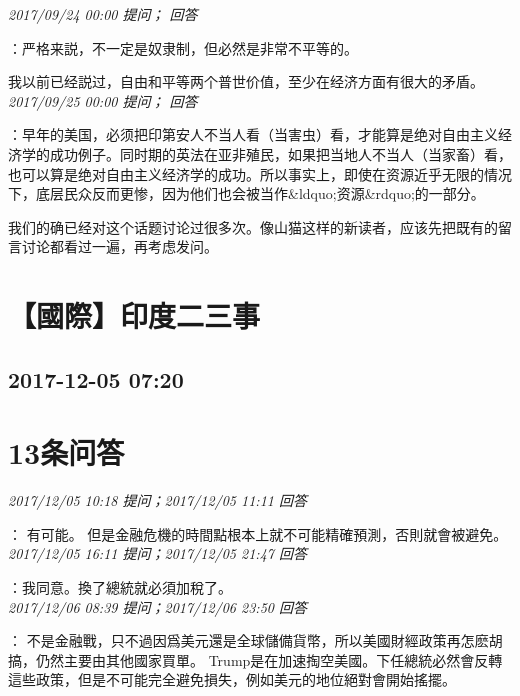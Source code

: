 \documentclass[twocolumn]{ctexart}
\begin{document}
\textit{\hfill\noindent\small 2017/09/24 00:00 提问； 回答}

：严格来説，不一定是奴隶制，但必然是非常不平等的。

我以前已经説过，自由和平等两个普世价值，至少在经济方面有很大的矛盾。\\

\textit{\hfill\noindent\small 2017/09/25 00:00 提问； 回答}

：早年的美国，必须把印第安人不当人看（当害虫）看，才能算是绝对自由主义经济学的成功例子。同时期的英法在亚非殖民，如果把当地人不当人（当家畜）看，也可以算是绝对自由主义经济学的成功。所以事实上，即使在资源近乎无限的情况下，底层民众反而更惨，因为他们也会被当作\&ldquo;资源\&rdquo;的一部分。

我们的确已经对这个话题讨论过很多次。像山猫这样的新读者，应该先把既有的留言讨论都看过一遍，再考虑发问。\\


\section{【國際】印度二三事}
\subsection{2017-12-05 07:20}


\section{13条问答}

\textit{\hfill\noindent\small 2017/12/05 10:18 提问；2017/12/05 11:11 回答}

：
有可能。
但是金融危機的時間點根本上就不可能精確預測，否則就會被避免。
\\

\textit{\hfill\noindent\small 2017/12/05 16:11 提问；2017/12/05 21:47 回答}

：我同意。換了總統就必須加稅了。
\\

\textit{\hfill\noindent\small 2017/12/06 08:39 提问；2017/12/06 23:50 回答}

：
不是金融戰，只不過因爲美元還是全球儲備貨幣，所以美國財經政策再怎麽胡搞，仍然主要由其他國家買單。
Trump是在加速掏空美國。下任總統必然會反轉這些政策，但是不可能完全避免損失，例如美元的地位絕對會開始搖擺。
\\
\end{document}
